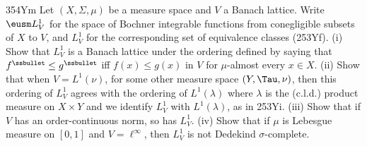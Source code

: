 {\spheader 354Ym Let $(X,\Sigma,\mu)$ be a measure space and $V$ a Banach
lattice.   Write $\eusm L^1_V$ for the space of Bochner integrable
functions from conegligible subsets of $X$ to $V$, and $L^1_V$ for the
corresponding set of equivalence classes (253Yf).   (i) Show that
$L^1_V$ is a Banach lattice under the ordering defined by saying that
$f^{\ssbullet}\le g^{\ssbullet}$ iff $f(x)\le g(x)$ in $V$ for
$\mu$-almost every $x\in X$.  (ii) Show that when $V=L^1(\nu)$, for some
other measure space $(Y,\Tau,\nu)$, then this ordering of $L^1_V$ agrees
with the ordering of $L^1(\lambda)$ where $\lambda$ is the (c.l.d.)
product measure on $X\times Y$ and we identify $L^1_V$ with
$L^1(\lambda)$, as in 253Yi.   (iii) Show that if $V$ has an
order-continuous norm, so has $L^1_V$.      (iv) Show
that if $\mu$ is Lebesgue measure on $[0,1]$ and $V=\ell^{\infty}$, then
$L^1_V$ is not Dedekind $\sigma$-complete.
}%

